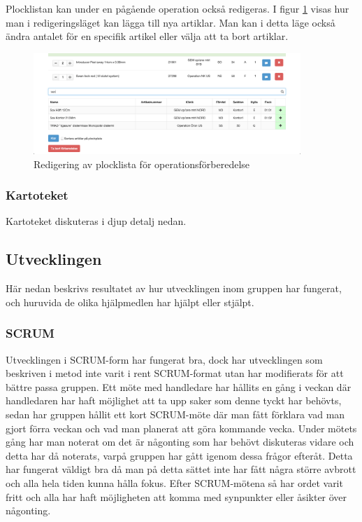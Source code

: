 Plocklistan kan under en pågående operation också redigeras. I figur \ref{fig:plocklistaredigering} visas hur man i redigeringsläget kan lägga till nya artiklar. Man kan i detta läge också ändra antalet för en specifik artikel eller välja att ta bort artiklar.

\begin{figure}
  \centering
  \includegraphics[width=0.9\textwidth]{images/site/plocklistaredigering}
  \caption{Redigering av plocklista för operationsförberedelse}
  \label{fig:plocklistaredigering}
\end{figure}

\subsubsection{Kartoteket}
Kartoteket diskuteras i djup detalj nedan.

\subsection{Utvecklingen}
Här nedan beskrivs resultatet av hur utvecklingen inom gruppen har fungerat,
och huruvida de olika hjälpmedlen har hjälpt eller stjälpt.

\subsubsection{SCRUM}
Utvecklingen i SCRUM-form har fungerat bra,
dock har utvecklingen som beskriven i metod inte varit i rent SCRUM-format utan har modifierats för att bättre passa gruppen.
Ett möte med handledare har hållits en gång i veckan där handledaren har haft möjlighet att ta upp saker som denne tyckt har behövts,
sedan har gruppen hållit ett kort SCRUM-möte där man fått förklara vad man gjort förra veckan och vad man planerat
att göra kommande vecka. Under mötets gång har man noterat om det är någonting som har behövt diskuteras
vidare och detta har då noterats, varpå gruppen har gått igenom dessa frågor efteråt. Detta har fungerat väldigt bra då man på detta sättet inte har fått några större avbrott och alla hela tiden kunna hålla fokus. Efter SCRUM-mötena så har ordet varit fritt och alla har haft möjligheten att komma med synpunkter eller åsikter över någonting.


